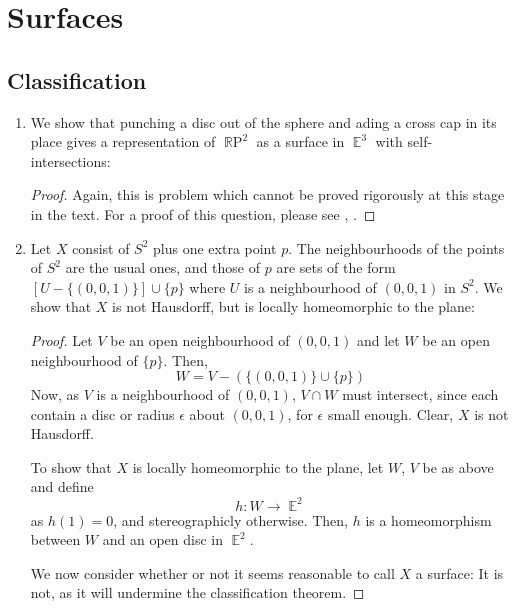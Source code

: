 \documentclass{book}
\DeclareMathOperator*{\R}{\mathbb{R}}
\DeclareMathOperator*{\E}{\mathbb{E}}
\DeclareMathOperator*{\RP}{\R\text{P}}
\begin{document}
\chapter{Surfaces}
\section{Classification}
\begin{enumerate}[(1)]
    \item We show that punching a disc out of the sphere and ading a cross cap in its place gives a representation of $\RP^2$ as a surface in $\E^3$ with self-intersections:  
        \begin{proof} Again, this is problem which cannot be proved rigorously at this stage in the text. For a proof of this question, please see \cite{classificaionSurfaces}, \cite{classificationArticle}.
        \end{proof}

    \item Let $X$ consist of $S^2$ plus one extra point $p$. The neighbourhoods of the points of $S^2$ are the usual ones, and those of $p$ are sets of the form $[U - \{(0,0,1)\}] \cup \{p\}$ where $U$ is a neighbourhood of $(0,0,1)$ in $S^2$. We show that $X$ is not Hausdorff, but is locally homeomorphic to the plane: 
        \begin{proof} Let $V$ be an open neighbourhood of $(0,0,1)$ and let $W$ be an open neighbourhood of $\{p\}$. Then, 
            \[W = V - (\{(0,0,1)\} \cup \{p\})\]
            Now, as $V$ is a neighbourhood of $(0,0,1)$, $V \cap W$ must intersect, since each contain a disc or radius $\epsilon$ about $(0,0,1)$, for $\epsilon$ small enough. Clear, $X$ is not Hausdorff.  
            \par To show that $X$ is locally homeomorphic to the plane, let $W$, $V$ be as above and define 
            \[h: W \rightarrow \E^2\]
            as $h(1) = 0$, and stereographicly otherwise. Then, $h$ is a homeomorphism between $W$ and an open disc in $\E^2$.
            \par We now consider whether or not it seems reasonable to call $X$ a surface: It is not, as it will undermine the classification theorem. 
        \end{proof}


\end{enumerate}
\end{document}
